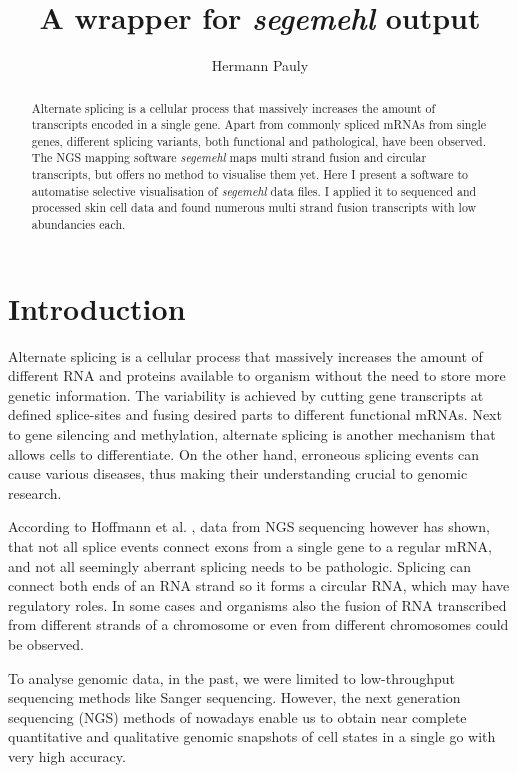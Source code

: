 \documentclass[11pt]{article}
\author{Hermann Pauly}
\date{}
\title{A wrapper for \emph{segemehl} output}
\begin{document}
\maketitle
\begin{abstract}
Alternate splicing is a cellular process that massively increases the amount of transcripts
encoded in a single gene. Apart from commonly spliced mRNAs from single genes, different splicing
variants, both functional and pathological, have been observed. The NGS mapping software
\emph{segemehl} maps multi strand fusion and circular transcripts, but offers no method to
visualise them yet. Here I present a software to automatise selective visualisation of 
\emph{segemehl} data files. I applied it to sequenced and processed skin cell data and found 
numerous multi strand fusion transcripts with low abundancies each.
\end{abstract}



\section{Introduction}
\label{sec-1}

Alternate splicing is a cellular process that massively increases the amount of different RNA
and proteins available to organism without the need to store more genetic information. 
The variability is achieved by cutting gene transcripts at defined splice-sites and fusing
desired parts to different functional mRNAs.
Next to gene silencing and methylation, alternate splicing is another mechanism that allows 
cells to differentiate.
On the other hand, erroneous splicing events can cause various diseases, thus making their
understanding crucial to genomic research.

According to Hoffmann et al. \cite{smpaper}, data from NGS sequencing however has shown, that not
all splice events connect exons from a single gene to a regular mRNA, and not all seemingly
aberrant splicing needs to be pathologic.
Splicing can connect both ends of an RNA strand so it forms a circular RNA, which may have
regulatory roles. 
In some cases and organisms also the fusion of RNA transcribed from different strands of a 
chromosome or even from different chromosomes could be observed.

To analyse genomic data, in the past, we were limited to low-throughput sequencing methods like
Sanger sequencing.
However, the next generation sequencing (NGS) methods of nowadays enable us to obtain near 
complete quantitative and qualitative genomic snapshots of cell states in a single go with very 
high accuracy.
\end{document}
